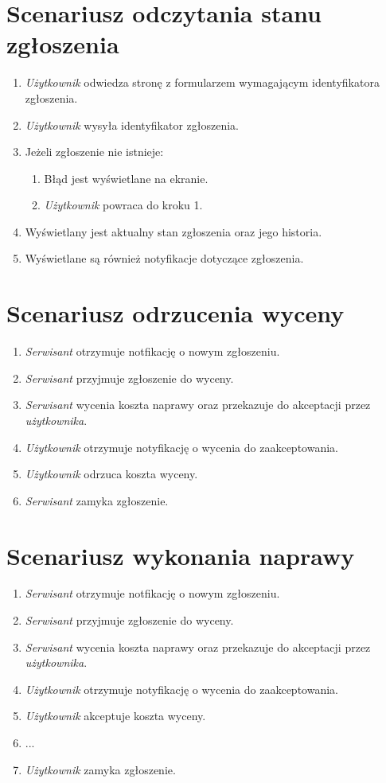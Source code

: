 \documentclass[11pt,a4paper]{article}
\begin{document}
\section{Scenariusz odczytania stanu zgłoszenia}
\begin{enumerate}
\item{\textit{Użytkownik} odwiedza stronę z formularzem wymagającym identyfikatora zgłoszenia.}
\item{\textit{Użytkownik} wysyła identyfikator zgłoszenia.}
\item{Jeżeli zgłoszenie nie istnieje:}
\begin{enumerate}
\item{Błąd jest wyświetlane na ekranie.}
\item{\textit{Użytkownik} powraca do kroku 1.}
\end{enumerate}
\item{Wyświetlany jest aktualny stan zgłoszenia oraz jego historia.}
\item{Wyświetlane są również notyfikacje dotyczące zgłoszenia.}
\end{enumerate}

\section{Scenariusz odrzucenia wyceny}
\begin{enumerate}
\item{\textit{Serwisant} otrzymuje notfikację o nowym zgłoszeniu.}
\item{\textit{Serwisant} przyjmuje zgłoszenie do wyceny.}
\item{\textit{Serwisant} wycenia koszta naprawy oraz przekazuje do akceptacji przez \textit{użytkownika}.}
\item{\textit{Użytkownik} otrzymuje notyfikację o wycenia do zaakceptowania.}
\item{\textit{Użytkownik} odrzuca koszta wyceny.}
\item{\textit{Serwisant} zamyka zgłoszenie.}
\end{enumerate}

\section{Scenariusz wykonania naprawy}
\begin{enumerate}
\item{\textit{Serwisant} otrzymuje notfikację o nowym zgłoszeniu.}
\item{\textit{Serwisant} przyjmuje zgłoszenie do wyceny.}
\item{\textit{Serwisant} wycenia koszta naprawy oraz przekazuje do akceptacji przez \textit{użytkownika}.}
\item{\textit{Użytkownik} otrzymuje notyfikację o wycenia do zaakceptowania.}
\item{\textit{Użytkownik} akceptuje koszta wyceny.}
\item{...}
\item{\textit{Użytkownik} zamyka zgłoszenie.}
\end{enumerate}
\end{document}
